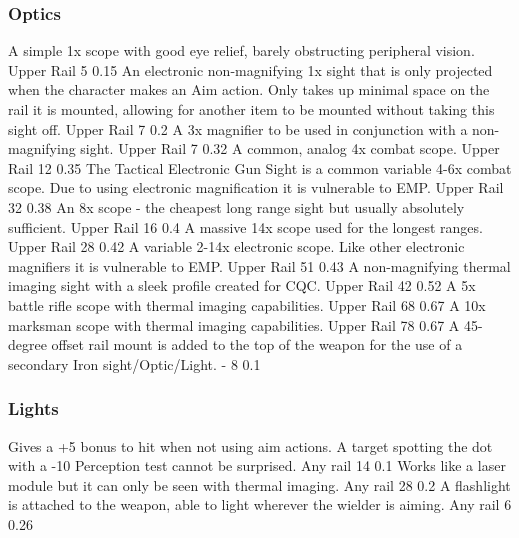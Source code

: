 \subsubsection{Optics}
\vspace{8mm}
\begin{multicols}{2}
    {A simple 1x scope with good eye relief, barely obstructing peripheral vision.}
    {Upper Rail}
    {5}
    {0.15}
    {An electronic non-magnifying 1x sight
    	that is only projected when the character makes an Aim action.
    	Only takes up minimal space on the rail it is mounted,
    	allowing for another item to be mounted without taking this sight off.}
    {Upper Rail}
    {7}
    {0.2}
    {A 3x magnifier to be used in conjunction with a non-magnifying sight.}
    {Upper Rail}
    {7}
    {0.32}
    {A common, analog 4x combat scope.}
    {Upper Rail}
    {12}
    {0.35}
    {The Tactical Electronic Gun Sight is a common variable 4-6x combat scope.
        Due to using electronic magnification it is vulnerable to EMP.}
    {Upper Rail}
    {32}
    {0.38}
    {An 8x scope - the cheapest long range sight but usually absolutely sufficient.}
    {Upper Rail}
    {16}
    {0.4}
    {A massive 14x scope used for the longest ranges.}
    {Upper Rail}
    {28}
    {0.42}
    {A variable 2-14x electronic scope.
        Like other electronic magnifiers it is vulnerable to EMP.}
    {Upper Rail}
    {51}
    {0.43}
    {A non-magnifying thermal imaging sight with a sleek profile created for CQC.}
    {Upper Rail}
    {42}
    {0.52}
    {A 5x battle rifle scope with thermal imaging capabilities.}
    {Upper Rail}
    {68}
    {0.67}
    {A 10x marksman scope with thermal imaging capabilities.}
    {Upper Rail}
    {78}
    {0.67}
    {A 45-degree offset rail mount is added to the top of the weapon
        for the use of a secondary Iron sight/Optic/Light.}
    {-}
    {8}
    {0.1}
\end{multicols}

\subsubsection{Lights}
\vspace{8mm}
\begin{multicols}{2}
    {Gives a +5 bonus to hit when not using aim actions.
        A target spotting the dot with a -10 Perception test cannot be surprised.}
    {Any rail}
    {14}
    {0.1}
    {Works like a laser module but it can only be seen with thermal imaging.}
    {Any rail}
    {28}
    {0.2}
    {A flashlight is attached to the weapon,
        able to light wherever the wielder is aiming.}
    {Any rail}
    {6}
    {0.26}
\end{multicols}


